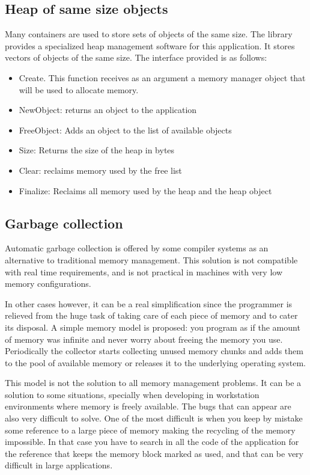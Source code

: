 \documentclass[12pt,a4paper,openany]{memoir} %
\begin{document}
\subsection{Heap of same size objects}
Many containers are used to store sets of objects of the same size. The library provides a specialized heap management software for this application. It stores vectors of objects of the same size. The interface provided is as follows:
\begin{itemize}
\item Create. This function receives as an argument a memory manager object that will be used to allocate memory.
\item NewObject: returns an object to the application
\item FreeObject: Adds an object to the list of available objects
\item Size: Returns the size of the heap in bytes
\item Clear: reclaims memory used by the free list
\item Finalize: Reclaims all memory used by the heap and the heap object
\end{itemize}

\subsection{Garbage collection}
Automatic garbage collection is offered by some compiler systems as an alternative to traditional memory management. This solution is
not compatible with real time requirements, and is not practical in machines with very low memory configurations.

In other cases however, it can be a real simplification since the programmer is relieved from the huge task of taking care of each
piece of memory and to cater its disposal. A simple memory model is proposed: you program as if the amount of memory was infinite
and never worry about freeing the memory you use. Periodically the collector starts collecting unused memory chunks and adds them
to the pool of available memory or releases it to the underlying operating system.

This model is not the solution to all memory management problems. It can be a solution to some situations, specially when developing
in workstation environments where memory is freely available. The bugs that can appear are also very difficult to solve. One of the
most difficult is when you keep by mistake some reference to a large piece of memory making the recycling of the memory impossible.
In that case you have to search in all the code of the application for the reference that keeps the memory block marked as used, and that can
be very difficult in large applications.
\end{document}
